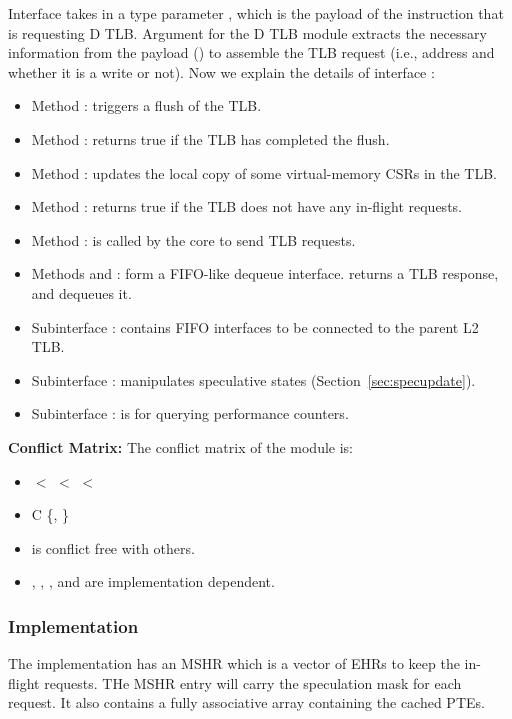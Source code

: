 Interface  takes in a type parameter , which is the payload of the instruction that is requesting D TLB.
Argument  for the D TLB module extracts the necessary information from the payload () to assemble the TLB request (i.e., address and whether it is a write or not).
Now we explain the details of interface :
\begin{itemize}
    \item Method : triggers a flush of the TLB.
    \item Method : returns true if the TLB has completed the flush.
    \item Method : updates the local copy of some virtual-memory CSRs in the TLB.
    \item Method : returns true if the TLB does not have any in-flight requests.
    \item Method : is called by the core to send TLB requests.
    \item Methods  and : form a FIFO-like dequeue interface.
     returns a TLB response, and  dequeues it.
    \item Subinterface : contains FIFO interfaces to be connected to the parent L2 TLB.
    \item Subinterface : manipulates speculative states (Section~\ref{sec:specupdate}).
    \item Subinterface : is for querying performance counters.
\end{itemize}

\noindent\textbf{Conflict Matrix:}
The conflict matrix of the module is:
\begin{itemize}
    \item {} $<$  $<$  $<$ 
    \item {} C \{, \}
    \item {} is conflict free with others.
    \item {}, , , and  are implementation dependent.
\end{itemize}

\subsubsection{Implementation}
The implementation has an MSHR which is a vector of EHRs to keep the in-flight requests.
THe MSHR entry will carry the speculation mask for each request.
It also contains a fully associative array containing the cached PTEs.

